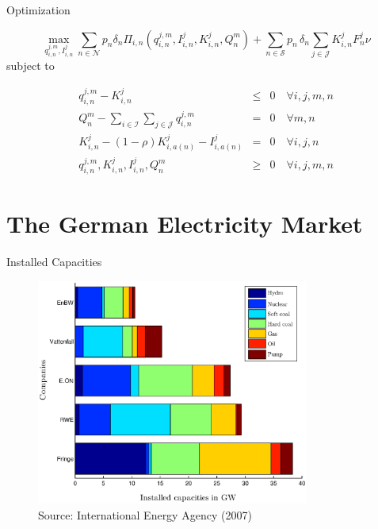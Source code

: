 \begin{frame}{Optimization}

\begin{equation}
  \label{eq:objfct}
  \max_{q_{i,n}^{j,m}, I_{i,n}^{j}} \sum_{n\in \mathcal{N}}p_n\delta_n\Pi_{i,n}\left(q_{i,n}^{j,m}, I_{i,n}^{j}, K_{i,n}^{j}, Q_n^m\right)+ \sum_{n\in \mathcal{S}}p_n\,\delta_n \sum_{j\in \mathcal{J}}K_{i,n}^{j}F_n^{j}\nu
\end{equation}
subject to
  
\begin{eqnarray}  
q_{i,n}^{j,m} - K_{i,n}^{j} &\leq& 0 \quad \forall i,j,m,n \label{eq:prodconstr} \\
Q_n^m-\sum_{i\in \mathcal{I}}\sum_{j\in \mathcal{J}} q_{i,n}^{j,m} &=& 0 \quad \forall m,n \label{eq:marketclearing}\\
K_{i,n}^{j} - (1-\rho)K_{i,a(n)}^{j}-I_{i,a(n)}^{j} &=& 0 \quad \forall i,j,n \label{eq:state} \\
q_{i,n}^{j,m}, K_{i,n}^{j}, I_{i,n}^{j}, Q_n^m  &\geq& 0 \quad \forall i,j,m,n\label{eq:nonneg}
\end{eqnarray}
  
\end{frame}



\section{The German Electricity Market}


\begin{frame}{Installed Capacities}
					
\begin{figure}[h]
  \centering
\includegraphics[width=0.8\textwidth]{capacities}
  \label{fig:capacities}
\\
\vspace{0.1cm}
\scriptsize Source: International Energy Agency (2007)
\end{figure}

\end{frame}

